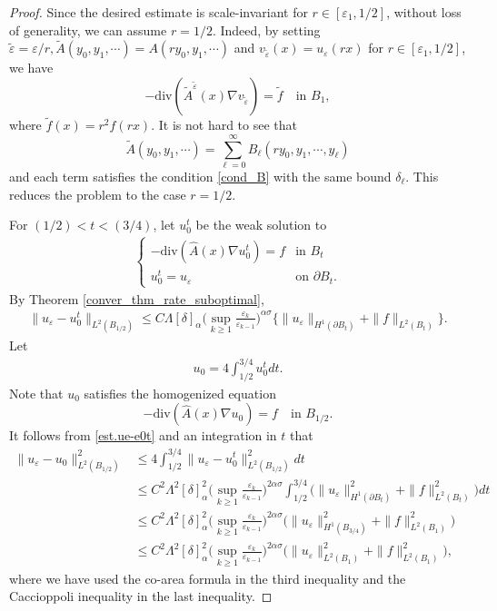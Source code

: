 \documentclass[reqno,12pt]{amsart} %
\theoremstyle{definition}
\theoremstyle{remark}
\numberwithin{equation}{section}
\newcommand{\e}{\varepsilon}
\begin{document}
\begin{proof}
  Since the desired estimate is scale-invariant for $r\in [\e_1, 1/2]$, without loss of generality, we can assume $r=1/2$. Indeed, by setting $\widetilde{\e} = \e/r, \widetilde{A}(y_0, y_1,\cdots) = A(ry_0, y_1,\cdots )$ and $v_{\widetilde{\e}}(x) = u_\varepsilon(rx)$ for $r\in [\varepsilon_1, 1/2]$, we have 
  $$-\mathrm{div}(\widetilde{A}^{\widetilde{\e}}(x)\nabla v_{\widetilde{\e}}) = \widetilde{f} \quad \text{in } B_1,$$ 
  where $\widetilde{f}(x)=r^2f(rx)$. It is not hard to see that 
  $$\widetilde{A}(y_0, y_1, \cdots)=\sum_{\ell=0}^\infty B_\ell(ry_0, y_1, \cdots, y_\ell)$$ 
  and each term satisfies the condition \eqref{cond_B} with the same bound $\delta_\ell$. This reduces the problem to the case $r = 1/2$.

  For $(1/2)<t<(3/4)$, let $u_0^t$ be the weak solution to
\begin{align*}
  \begin{cases}
    -\mathrm{div}(\widehat{A}(x)\nabla u_0^t)=f &\text{in }B_t\\
    u_0^t=u_\varepsilon&\text{on }\partial B_t.
  \end{cases}
\end{align*}
By Theorem \ref{conver_thm_rate_suboptimal},
\begin{align}\label{est.ue-e0t}
  \|u_\varepsilon-u_0^t\|_{L^2(B_{1/2})}\leq C\Lambda [\delta]_\alpha\Big(\sup_{k\geq 1} \frac{\e_k}{\e_{k-1}}\Big)^{\alpha\sigma}\Big\{\|u_\varepsilon\|_{H^{1}(\partial B_t)}+\|f\|_{L^2(B_t)}\Big\}.
\end{align}
Let
\begin{align*}
  u_0=4\int_{1/2}^{3/4} u_0^tdt. 
\end{align*}
Note that $u_0$ satisfies the homogenized equation 
$$-\mathrm{div}(\widehat{A}(x)\nabla u_0)=f \quad \text{in } B_{1/2}.$$ 
It follows from \eqref{est.ue-e0t} and an integration in $t$ that
\begin{align*}
  \|u_\varepsilon-u_0\|_{L^2(B_{1/2})}^2&\leq 4\int_{1/2}^{3/4}\|u_\varepsilon-u_0^t\|_{L^2(B_{1/2})}^2dt\\
  & \leq C^2\Lambda^2 [\delta]_\alpha^2 \Big(\sup_{k\geq 1} \frac{\e_k}{\e_{k-1}}\Big)^{2\alpha\sigma} \int_{1/2}^{3/4} \Big(\|u_\varepsilon\|_{H^{1}(\partial B_t)}^2+\|f\|_{L^2(B_t)}^2\Big) dt\\
  & \leq C^2\Lambda^2 [\delta]_\alpha^2 \Big(\sup_{k\geq 1} \frac{\e_k}{\e_{k-1}}\Big)^{2\alpha\sigma}\Big(\|u_\varepsilon\|_{H^{1}(B_{3/4})}^2 + \|f\|_{L^2(B_{1})}^2\Big) \\
  & \leq C^2 \Lambda^2  [\delta]_\alpha^2 \Big(\sup_{k\geq 1} \frac{\e_k}{\e_{k-1}}\Big)^{2\alpha\sigma}\Big(\|u_\varepsilon\|_{L^2(B_{1})}^2 + \|f\|_{L^2(B_{1})}^2\Big),
\end{align*}
where we have used the co-area formula in the third inequality and the Caccioppoli inequality in the last inequality.
\end{proof}
\end{document}
